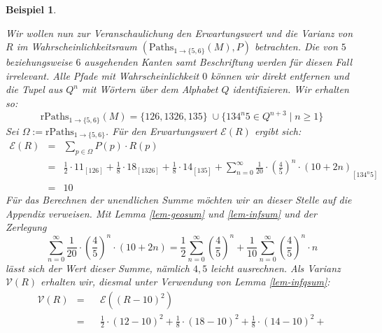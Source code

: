 \documentclass[a4paper]{article}
\newtheorem{beispiel}[satz]{Beispiel}
\theoremstyle{nonumberplain}
\begin{document}
\begin{beispiel}
\begin{center}
	\end{center}
	Wir wollen nun zur Veranschaulichung den Erwartungswert und die Varianz von $R$ im Wahrscheinlichkeitsraum $(\mathrm{Paths}_{1 \rightarrow \{5,6\}}(M), P)$ betrachten. Die von $5$ beziehungsweise $6$ ausgehenden Kanten samt Beschriftung werden für diesen Fall irrelevant. Alle Pfade mit Wahrscheinlichkeit $0$ können wir direkt entfernen und die Tupel aus $Q^n$ mit Wörtern über dem Alphabet $Q$ identifizieren. Wir erhalten so:
	\begin{equation*}
	\mathrm{rPaths}_{1 \rightarrow \{5,6\}}(M) = \big\{126,1326,135\big\} \; \cup \big\{134^n5 \in Q^{n+3} \mid n\geq 1\big\} 
	\end{equation*}
	Sei $\Omega := \mathrm{rPaths}_{1 \rightarrow \{5,6\}}$. Für den Erwartungswert $\mathcal{E}(R)$ ergibt sich:
	\newcommand{\exres}{10}
	\begin{align*}
	\mathcal{E}(R) & = & \sum_{p \in \Omega}{P(p) \cdot R(p)}\\
	& = & \frac{1}{2}\cdot 11_{\scriptscriptstyle [126]} + \frac{1}{8}\cdot 18_{\scriptscriptstyle [1326]} + \frac{1}{8}\cdot 14_{\scriptscriptstyle [135]} + \sum_{n = 0}^{\infty}{\frac{1}{20}\cdot\left(\frac{4}{5}\right)^n \cdot (10 + 2n)}_{\scriptscriptstyle [134^n5]} \\
	& = & \exres{}
\end{align*}
	Für das Berechnen der unendlichen Summe möchten wir an dieser Stelle auf die Appendix verweisen. Mit Lemma \ref{lem-geosum} und \ref{lem-infsum} und der Zerlegung 
	\begin{equation*}
		\sum_{n = 0}^{\infty}{\frac{1}{20}\cdot\left(\frac{4}{5}\right)^n \cdot (10 + 2n)}
		= \frac{1}{2}\sum_{n = 0}^{\infty}{\left(\frac{4}{5}\right)^n} + \frac{1}{10} \sum_{n = 0}^{\infty}{\left(\frac{4}{5}\right)^n \cdot n}
	\end{equation*}
	lässt sich der Wert dieser Summe, nämlich $4,5$ leicht ausrechnen.
	Als Varianz $\mathcal{V}(R)$ erhalten wir, diesmal unter Verwendung von Lemma \ref{lem-infqsum}:
	\begin{align*}
		\mathcal{V}(R) & = & & \mathcal{E}((R - \exres{})^2) \\
		& = & & \frac{1}{2}\cdot (12 - \exres)^2+ \frac{1}{8}\cdot (18-\exres)^2 + \frac{1}{8}\cdot (14-\exres)^2 + \\

\end{align*}
\end{beispiel}
\end{document}
